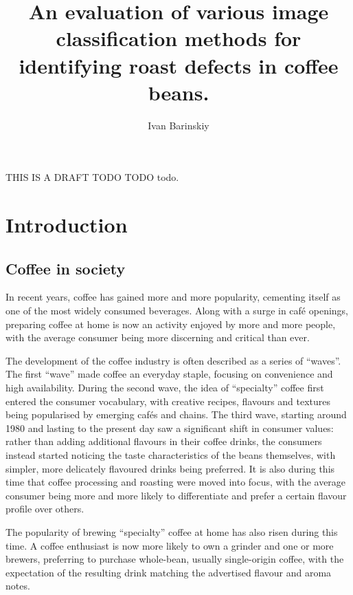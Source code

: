 \documentclass{./styles/UoYCSproject}
\author{Ivan Barinskiy}
\title{An evaluation of various image classification methods for identifying roast defects in coffee beans.}
\newcommand{\eaccentmark}{é}
\begin{document}
\maketitle
\listoffigures
\listoftables

\begin{summary}
THIS IS A DRAFT TODO TODO todo.
\end{summary}

\chapter{Introduction}
\label{ch:introduction}
\section{Coffee in society}
\label{sec:coffee-in-society}
In recent years, coffee has gained more and more popularity, cementing itself as one of the most widely consumed beverages.
Along with a surge in caf{\eaccentmark} openings, preparing coffee at home is now an activity enjoyed by more and more people, with the average consumer being more discerning and critical than ever.

The development of the coffee industry is often described as a series of ``waves''.
The first ``wave'' made coffee an everyday staple, focusing on convenience and high availability.
During the second wave, the idea of ``specialty'' coffee first entered the consumer vocabulary, with creative recipes, flavours and textures being popularised by emerging caf{\eaccentmark}s and chains.
The third wave, starting around 1980 and lasting to the present day saw a significant shift in consumer values:
rather than adding additional flavours in their coffee drinks, the consumers instead started noticing the taste characteristics of the beans themselves,
with simpler, more delicately flavoured drinks being preferred.
It is also during this time that coffee processing and roasting were moved into focus,
with the average consumer being more and more likely to differentiate and prefer a certain flavour profile over others.

The popularity of brewing ``specialty'' coffee at home has also risen during this time.
A coffee enthusiast is now more likely to own a grinder and one or more brewers, preferring to purchase whole-bean,
usually single-origin coffee, with the expectation of the resulting drink matching the advertised flavour and aroma notes.
\end{document}
